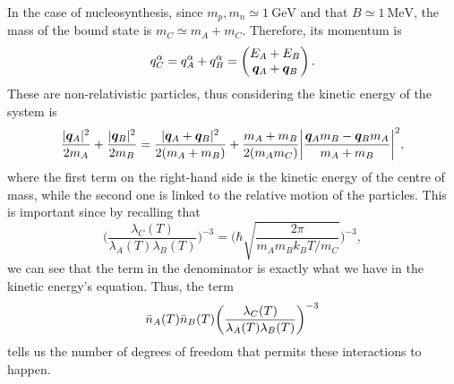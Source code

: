 In the case of nucleosynthesis, since $m_p,m_n \simeq \SI{1}{\GeV}$ and that $B \simeq \SI{1}{\MeV}$, the mass of the bound state is $m_C \simeq m_A + m_C$. Therefore, its momentum is 
\begin{equation}
    q_C^\alpha = q_A^\alpha + q^\alpha_B = 
    \begin{pmatrix}
        E_A + E_B \\
        \bm{q}_A + \bm{q}_B
    \end{pmatrix}.
\end{equation}
These are non-relativistic particles, thus considering the kinetic energy of the system is 
\begin{equation}
    \frac{|\bm{q}_A|^2}{2m_A} + \frac{|\bm{q}_B|^2}{2m_B} = \frac{|\bm{q}_A + \bm{q}_B|^2}{2(m_A + m_B)} + \frac{m_A + m_B}{2(m_A m_C)}\bigg|\frac{\bm{q}_Am_B - \bm{q}_Bm_A}{m_A + m_B}\bigg|^2,
\end{equation}
where the first term on the right-hand side is the kinetic energy of the centre of mass, while the second one is linked to the relative motion of the particles. This is important since by recalling that 
\begin{equation}
    \bigg(\frac{\lambda_C(T)}{\lambda_A(T)\lambda_B(T)}\bigg)^{-3} = \bigg(\hbar\sqrt{\frac{2\pi}{m_Am_Bk_BT/m_C}}\bigg)^{-3},
\end{equation}
we can see that the term in the denominator is exactly what we have in the kinetic energy's equation. Thus, the term 
\begin{equation}
    \bar{n}_A(T)\bar{n}_B(T)\bigg(\frac{\lambda_C(T)}{\lambda_A(T)\lambda_B(T)}\bigg)^{-3}
\end{equation}
tells us the number of degrees of freedom that permits these interactions to happen. 

